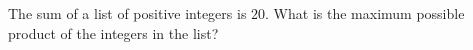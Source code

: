 The sum of a list of positive integers is $20$. What is the maximum possible product of the integers in the list?
